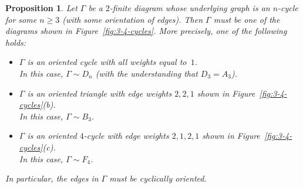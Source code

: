 \documentclass[letterpaper]{amsart}
\numberwithin{equation}{section}
\newtheorem{proposition}[theorem]{Proposition}
\theoremstyle{definition}
\begin{document}
\begin{proposition} 
\label{pr:cycles-Dynkin-vs-infty} 
Let $\Gamma$ be a $2$-finite diagram whose underlying graph is an 
$n$-cycle for some $n \geq 3$ 
(with some orientation of edges). 
Then %
$\Gamma$ must be one of the diagrams shown in 
Figure~\ref{fig:3-4-cycles}. 
More precisely, one of the following holds: 
\begin{itemize} 
 
\item[{\rm(a)}] $\Gamma$ is an oriented cycle with all weights equal 
 to~$1$. \\ 
In this case, $\Gamma\sim D_n$ (with the understanding that $D_3 =A_3$). 
 
\item[{\rm(b)}] $\Gamma$ is an oriented triangle with 
edge weights $2,2,1$ shown in 
 Figure~\ref{fig:3-4-cycles}(b). \\ 
In this case, $\Gamma\sim B_3$. 
 
\item[{\rm(c)}] $\Gamma$ is an oriented $4$-cycle with 
edge weights $2,1,2,1$ shown in 
 Figure~\ref{fig:3-4-cycles}(c). \\ 
In this case, $\Gamma\sim F_4$. 
 
\end{itemize} 
In particular, the edges in $\Gamma$ must be cyclically oriented. 
\end{proposition} 
 
\end{document}
